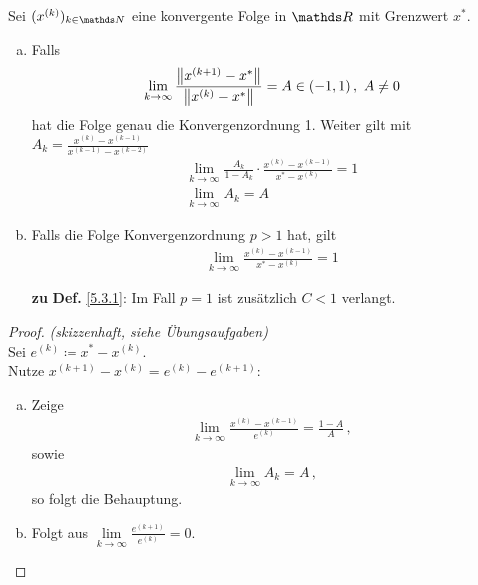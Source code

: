 \begin{Leme}
  \label{5.3.5}
  Sei $(x^{(k)})_{k\in\N}$ eine konvergente Folge in $\R$ mit Grenzwert $x^{*}$.
  \begin{enumerate}[a)]
  \item Falls 
    \begin{gather}
      \lim\limits_{k\rightarrow \infty}\frac{\left\| x^{(k+1)}-x^{*} \right\|}{\left\| x^{(k)}-x^{*} \right\|}=
      A\in (-1,1)\, ,~ A\neq 0
      \label{V.3.1}
    \end{gather}
    hat die Folge genau die Konvergenzordnung 1.
    Weiter gilt mit $A_k=\frac{x^{(k)}-x^{(k-1)}}{x^{(k-1)}-x^{(k-2)}}$
    \begin{gather}
      \lim\limits_{k\rightarrow \infty}\frac{A_k}{1-A_k}\cdot 
      \frac{x^{(k)}-x^{(k-1)}}{x^{*}-x^{(k)}}=1 
      \label{V.3.2}
      \\ \nonumber
      \lim\limits_{k\rightarrow\infty}A_k=A
    \end{gather}
  \item Falls die Folge Konvergenzordnung $p>1$ hat, gilt
    \begin{gather}
      \lim\limits_{k\rightarrow\infty}\frac{x^{(k)}-x^{(k-1)}}{x^{*}-x^{(k)}}=1
      \label{V.3.3}
    \end{gather}
  \item[\textbf{zu}]\textbf{Def.} \ref{5.3.1}:  Im Fall $p=1$ ist zusätzlich $C<1 $ verlangt.
  \end{enumerate}
\end{Leme} 

\begin{proof}
  \textit{(skizzenhaft, siehe Übungsaufgaben)}\\
  Sei $e^{(k)}\coloneqq x^{*}-x^{(k)}$.\\
  Nutze $x^{(k+1)}-x^{(k)} = e^{(k)}-e^{(k+1)}$:
  \begin{enumerate}[a)]
  \item Zeige 
    \begin{gather*} 
      \lim\limits_{k\rightarrow\infty}\frac{x^{(k)}-x^{(k-1)}}{e^{(k)}} = \frac{1-A}{A}\, ,
    \end{gather*}
    sowie
    \begin{gather*}
      \lim\limits_{k\rightarrow \infty}A_k = A \, ,
    \end{gather*}
    so folgt die Behauptung.
  \item Folgt aus $\lim\limits_{k\rightarrow\infty} \frac{e^{(k+1)}}{e^{(k)}} =0$.
  \end{enumerate}
\end{proof}

